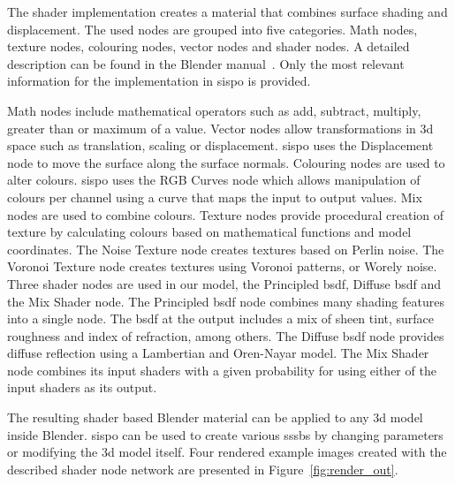 The shader implementation creates a material that combines surface shading and displacement. The used nodes are grouped into five categories. Math nodes, texture nodes, colouring nodes, vector nodes and shader nodes. A detailed description can be found in the Blender manual~\cite{IntroductionNodes}. Only the most relevant information for the implementation in \gls{sispo} is provided.

Math nodes include mathematical operators such as add, subtract, multiply, greater than or maximum of a value. Vector nodes allow transformations in \gls{3d} space such as translation, scaling or displacement. \Gls{sispo} uses the Displacement node to move the surface along the surface normals. Colouring nodes are used to alter colours. \Gls{sispo} uses the RGB Curves node which allows manipulation of colours per channel using a curve that maps the input to output values. Mix nodes are used to combine colours. Texture nodes provide procedural creation of texture by calculating colours based on mathematical functions and model coordinates. The Noise Texture node creates textures based on Perlin noise. The Voronoi Texture node creates textures using Voronoi patterns, or Worely noise. Three shader nodes are used in our model, the Principled \gls{bsdf}, Diffuse \gls{bsdf} and the Mix Shader node. The Principled \gls{bsdf} node combines many shading features into a single node. The \gls{bsdf} at the output includes a mix of sheen tint, surface roughness and index of refraction, among others. The Diffuse \gls{bsdf} node provides diffuse reflection using a Lambertian and Oren-Nayar model. The Mix Shader node combines its input shaders with a given probability for using either of the input shaders as its output.

The resulting shader based Blender material can be applied to any \gls{3d} model inside Blender. \Gls{sispo} can be used to create various \glspl{sssb} by changing parameters or modifying the \gls{3d} model itself. Four rendered example images created with the described shader node network are presented in Figure~\ref{fig:render_out}.

